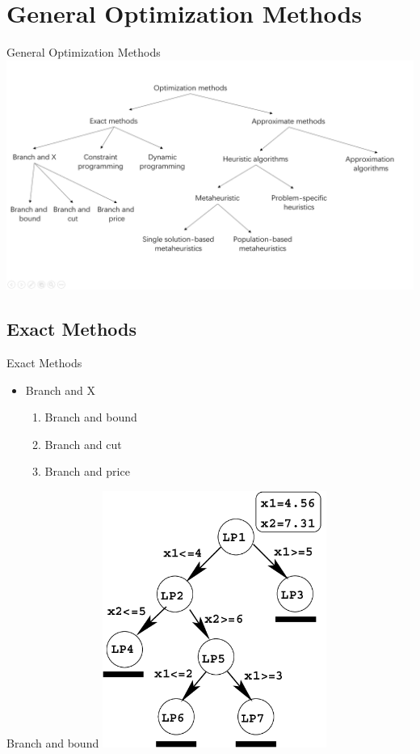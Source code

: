 \section{General Optimization Methods}

    \begin{frame}{General Optimization Methods}
        \centering
        \includegraphics[width = 1\textwidth]{images/opt.png}
    \end{frame}

    \subsection{Exact Methods}
    \frame{\sectionpage}

    \begin{frame}{Exact Methods}
      \begin{itemize}
        \item<+-> Branch and X
          \begin{enumerate}
          \item<+>  Branch and bound
          \item<+>  Branch and cut
          \item<+>  Branch and price
          \end{enumerate}
      \end{itemize}
    \end{frame}

    \begin{frame}{Branch and bound}
      \centering
      \includegraphics[width = 0.55\textwidth]{images/Branch.png}
    \end{frame}

